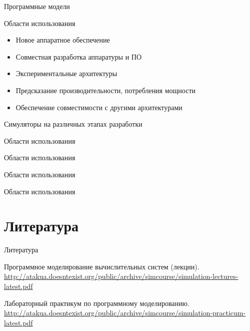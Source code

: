 \documentclass{beamer}
\begin{document}
\begin{frame}{Программные модели}
\centering 


\end{frame}


\begin{frame}{Области использования}

\begin{itemize}
\item Новое аппаратное обеспечение
\item Совместная разработка аппаратуры и ПО
\item Экспериментальные архитектуры
\item Предсказание производительности, потребления мощности
\item Обеспечение совместимости с другими архитектурами
\end{itemize}

\end{frame}


\begin{frame}{Симуляторы на различных этапах разработки}



\end{frame}

\begin{frame}{Области использования}

\end{frame}

\begin{frame}{Области использования}

\end{frame}

\begin{frame}{Области использования}

\end{frame}

\begin{frame}{Области использования}

\end{frame}

\section{Литература}

\begin{frame}[allowframebreaks]{Литература}
\begin{thebibliography}{99}
     Программное моделирование вычислительных систем (лекции). \url{http://atakua.doesntexist.org/public/archive/simcourse/simulation-lectures-latest.pdf}

     Лабораторный практикум по программному моделированию.  \url{http://atakua.doesntexist.org/public/archive/simcourse/simulation-practicum-latest.pdf}

\end{thebibliography}
\end{frame}
\end{document}
